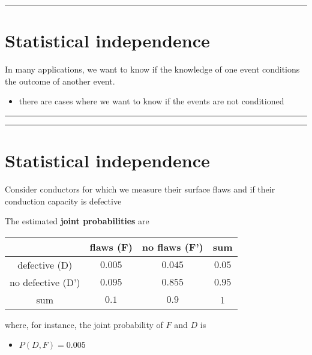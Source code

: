 \documentclass[
]{book}
\providecommand{\tightlist}{%
  \setlength{\itemsep}{0pt}\setlength{\parskip}{0pt}}
\begin{document}
\begin{center}\rule{0.5\linewidth}{0.5pt}\end{center}

\hypertarget{statistical-independence}{%
\section{Statistical independence}\label{statistical-independence}}

In many applications, we want to know if the knowledge of one event conditions the outcome of another event.

\begin{itemize}
\tightlist
\item
  there are cases where we want to know if the events are not conditioned
\end{itemize}

\begin{center}\rule{0.5\linewidth}{0.5pt}\end{center}

\begin{center}\rule{0.5\linewidth}{0.5pt}\end{center}

\hypertarget{statistical-independence-1}{%
\section{Statistical independence}\label{statistical-independence-1}}

Consider conductors for which we measure their surface flaws and if their conduction capacity is defective

The estimated \textbf{joint probabilities} are

\begin{longtable}[]{@{}cccc@{}}
\toprule
& flaws (F) & no flaws (F') & sum \\
\midrule
\endhead
defective (D) & \(0.005\) & \(0.045\) & \(0.05\) \\
no defective (D') & \(0.095\) & \(0.855\) & \(0.95\) \\
sum & \(0.1\) & \(0.9\) & 1 \\
\bottomrule
\end{longtable}

where, for instance, the joint probability of \(F\) and \(D\) is

\begin{itemize}
\tightlist
\item
  \(P(D,F)=0.005\)
\end{itemize}
\end{document}
